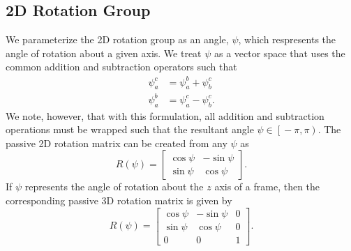 
\subsection{2D Rotation Group}

We parameterize the 2D rotation group as an angle, $\psi$, which respresents
the angle of rotation about a given axis.
We treat $\psi$ as a vector space
that uses the common addition and subtraction operators such that
\begin{align}
  \psi_a^c &= \psi_a^b + \psi_b^c \\
  \psi_a^b &= \psi_a^c - \psi_b^c.
\end{align}
We note, however, that with this formulation, all addition and subtraction
operations must be wrapped such
that the resultant angle $\psi \in \left[ \right. -\pi, \pi \left. \right)$. The
passive 2D
rotation matrix can be created from any $\psi$ as
\begin{equation}
  R \left( \psi \right) = \begin{bmatrix} \cos \psi & -\sin \psi \\ \sin \psi &
  \cos \psi \end{bmatrix}.
\end{equation}
If $\psi$ represents the angle of rotation about the $z$ axis of a frame, then
the corresponding passive 3D rotation matrix is given by
\begin{equation}
  R \left( \psi \right) = \begin{bmatrix}
    \cos \psi & -\sin \psi & 0 \\
    \sin \psi & \cos \psi & 0 \\
    0 & 0 & 1
  \end{bmatrix}.
\end{equation}

